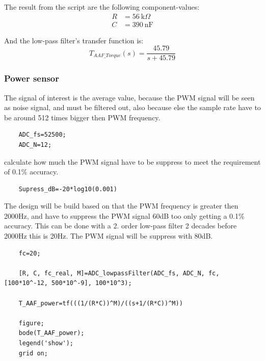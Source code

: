 The result from the script are the following component-values:	
\begin{equation}
	\begin{split}
	R &= \SI{56}{\kilo\Omega}\\
	C &= \SI{390}{\nano\F}
	\end{split}
\end{equation}
	
And the low-pass filter's transfer function is:
\begin{equation}
	T_{{AAF\_Torque}}(s) = \frac{45.79}{s+ 45.79}
\end{equation}
	
	
	
	
\subsubsection*{Power sensor}
The signal of interest is the average value, because the PWM signal will be seen as noise signal, and must be filtered out, also because else the sample rate have to be around 512 times bigger then PWM frequency.
	
\begin{lstlisting}
	ADC_fs=52500;
	ADC_N=12;
\end{lstlisting}
	
calculate how much the PWM signal have to be suppress to meet the requirement of 0.1\% accuracy.
	
\begin{lstlisting}
	Supress_dB=-20*log10(0.001)
\end{lstlisting}

The design will be build based on that the PWM frequency is greater then 2000Hz, and have to suppress the PWM signal 60dB too only getting a 0.1\% accuracy. This can be done with a 2. order low-pass filter 2 decades before 2000Hz this is 20Hz. The PWM signal will be suppress with 80dB.
	
\begin{lstlisting}
	fc=20;
	
	[R, C, fc_real, M]=ADC_lowpassFilter(ADC_fs, ADC_N, fc, [100*10^-12, 500*10^-9], 100*10^3);
	
	T_AAF_power=tf(((1/(R*C))^M)/((s+1/(R*C))^M))
	
	figure;
	bode(T_AAF_power);
	legend('show');
	grid on;
\end{lstlisting}

